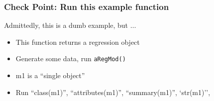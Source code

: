 \documentclass[11pt,english]{beamer}
\begin{document}



\begin{frame}
  \frametitle{Check Point: Run this example function}
  Admittedly, this is a dumb example, but $\ldots$
  \begin{itemize}
  \item This function returns a regression object

  \item Generate some data, run \texttt{aRegMod()}


  \item m1 is a ``single object''
  \item Run ``class(m1)'',  ``attributes(m1)'', ``summary(m1)'', `str(m1)'',
  \end{itemize}
\end{frame}








\end{document}
